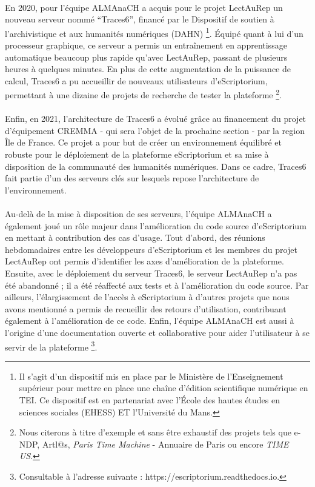 \documentclass[a4paper,12pt,twoside]{book}
\begin{document}
\paragraph{}
En 2020, pour l’équipe ALMAnaCH a acquis pour le projet LectAuRep un nouveau serveur nommé \enquote{Traces6}, financé par le Dispositif de soutien à l’archivistique et aux humanités numériques (DAHN) \footnote{Il s'agit d'un dispositif mis en place par le Ministère de l'Enseignement supérieur pour mettre en place une chaîne d'édition scientifique numérique en TEI. Ce dispositif est en partenariat avec l'École des hautes études en sciences sociales (EHESS) ET l'Université du Mans.}. Équipé quant à lui d'un processeur graphique, ce serveur a permis un entraînement en apprentissage automatique beaucoup plus rapide qu'avec LectAuRep, passant de plusieurs heures à quelques minutes. En plus de cette augmentation de la puissance de calcul, Traces6 a pu accueillir de nouveaux utilisateurs d’eScriptorium, permettant à une dizaine de projets de recherche de tester la plateforme \footnote{Nous citerons à titre d'exemple et sans être exhaustif des projets tels que e-NDP, Artl@s, \textit{Paris Time Machine} - Annuaire de Paris ou encore \textit{TIME US}.}. 

\paragraph{}
Enfin, en 2021, l’architecture de Traces6 a évolué grâce au financement du projet d’équipement CREMMA - qui sera l'objet de la prochaine section - par la region Île de France. Ce projet a pour but de créer un environnement équilibré et robuste pour le déploiement de la plateforme eScriptorium et sa mise à disposition de la communauté des humanités numériques. Dans ce cadre, Traces6 fait partie d’un des serveurs clés sur lesquels repose l’architecture de l'environnement. 

\paragraph{}
Au-delà de la mise à disposition de ses serveurs, l’équipe ALMAnaCH a également joué un rôle majeur dans l'amélioration du code source d'eScriptorium en mettant à contribution des cas d’usage. Tout d’abord, des réunions hebdomadaires entre les développeurs d’eScriptorium et les membres du projet LectAuRep ont permis d’identifier les axes d’amélioration de la plateforme. Ensuite, avec le déploiement du serveur Traces6, le serveur LectAuRep n’a pas été abandonné ; il a été réaffecté aux tests et à l’amélioration du code source. Par ailleurs, l'élargissement de l'accès à eScriptorium à d'autres projets que nous avons mentionné a permis de recueillir des retours d’utilisation, contribuant également à l'amélioration de ce code. Enfin, l’équipe ALMAnaCH est aussi à l’origine d’une documentation ouverte et collaborative pour aider l'utilisateur à se servir de la plateforme \footnote{Consultable à l'adresse suivante :  https://escriptorium.readthedocs.io.}.  
	
\end{document}

